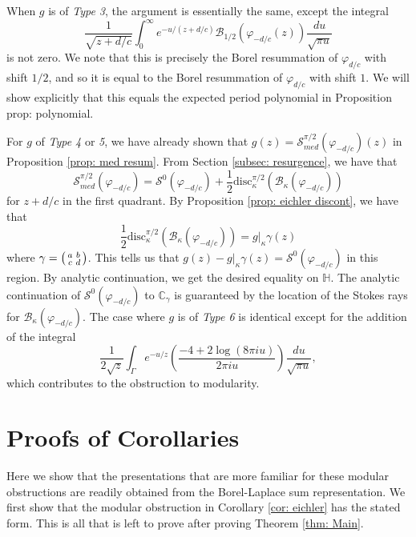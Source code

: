 \documentclass[12pt]{amsart}
\theoremstyle{definition}
\theoremstyle{plain}
\numberwithin{equation}{section}
\begin{document}
When $g$ is of \emph{Type 3}, the argument is essentially the same, except the integral
\[\frac{1}{\sqrt{z+d/c}} \int_{0}^{\infty}e^{-u/(z+d/c)} \mathcal{B}_{1/2}(\varphi_{-d/c}(z)) \frac{du}{\sqrt{\pi u}}\] is not zero. We note that this is precisely the Borel resummation of $\varphi_{d/c}$ with shift $1/2$, and so it is equal to the Borel resummation of $\varphi_{d/c}$ with shift $1$. We will show explicitly that this equals the expected period polynomial in Proposition {prop: polynomial}. 

For $g$ of \emph{Type 4} or \emph{5}, we have already shown that $g(z)=\mathcal{S}_{med}^{\pi/2}(\varphi_{-d/c})(z)$ in Proposition \ref{prop: med resum}. From Section \ref{subsec: resurgence}, we have that
\[\mathcal{S}_{med}^{\pi/2}(\varphi_{-d/c})=\mathcal{S}^{0}(\varphi_{-d/c}) + \frac{1}{2}\text{disc}_{\kappa}^{\pi/2}(\mathcal{B}_{\kappa}(\varphi_{-d/c}))\]
for $z+d/c$ in the first quadrant. By Proposition \ref{prop: eichler discont}, we have that 
\[\frac{1}{2}\text{disc}_{\kappa}^{\pi/2}(\mathcal{B}_{\kappa}(\varphi_{-d/c})) = g|_{\kappa}\gamma(z)
\]
where $\gamma = \begin{psmallmatrix} a & b \\ c & d
 \end{psmallmatrix}$. This tells us that $g(z) - g|_\kappa\gamma(z) = \mathcal{S}^0(\varphi_{-d/c})$ in this region. By analytic continuation, we get the desired equality on $\mathbb{H}$. The analytic continuation of $\mathcal{S}^0(\varphi_{-d/c})$ to $\mathbb{C}_\gamma$ is guaranteed by the location of the Stokes rays for $\mathcal{B}_\kappa (\varphi_{-d/c})$.
The case where $g$ is of \emph{Type 6} is identical except for the addition of the integral
\[\frac{1}{2\sqrt{z}}\int_\Gamma e^{-u/z} \left( \frac{-4+2\log(8\pi i u)}{2\pi i u} \right)\frac{du}{\sqrt{\pi u}},\]
which contributes to the obstruction to modularity.\hfill \qedsymbol


\section{Proofs of Corollaries}\label{sec: corollaries}

Here we show that the presentations that are more familiar for these modular obstructions are readily obtained from the Borel-Laplace sum representation. 
We first show that the modular obstruction in Corollary \ref{cor: eichler} has the stated form. This is all that is left to prove after proving Theorem \ref{thm: Main}. 
\end{document}
